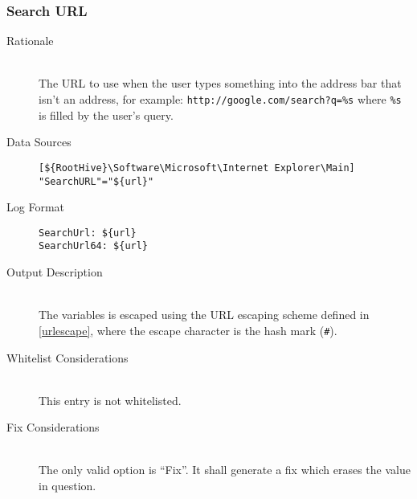 \subsubsection{Search URL}
\begin{description}
\item[Rationale] \hfill \\
The URL to use when the user types something into the address bar that isn't
an address, for example: \verb|http://google.com/search?q=%s| where \verb|%s|
is filled by the user's query.

\item[Data Sources] \hfill
\vspace{-\baselineskip}
\begin{verbatim}
[${RootHive}\Software\Microsoft\Internet Explorer\Main]
"SearchURL"="${url}"
\end{verbatim}
\item[Log Format] \hfill
\vspace{-\baselineskip}
\begin{verbatim}
SearchUrl: ${url}
SearchUrl64: ${url}
\end{verbatim}
\item[Output Description] \hfill \\
The variables  is escaped using the URL escaping
scheme defined in \ref{urlescape}, where the escape character is the hash mark
(\verb|#|).
\item[Whitelist Considerations] \hfill \\
This entry is not whitelisted.
\item[Fix Considerations] \hfill \\
The only valid option is ``Fix''. It shall generate a fix which erases the value
in question.
\end{description}

